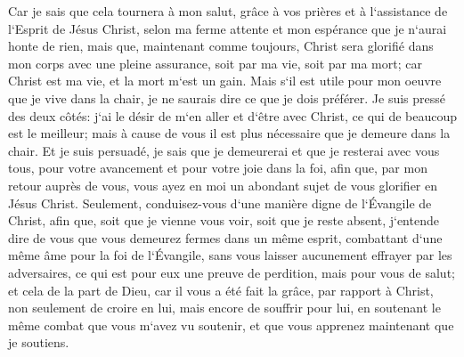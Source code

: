 \verse Car je sais que cela tournera à mon salut, grâce à vos prières et à l`assistance de l`Esprit de Jésus Christ, 
\verse selon ma ferme attente et mon espérance que je n`aurai honte de rien, mais que, maintenant comme toujours, Christ sera glorifié dans mon corps avec une pleine assurance, soit par ma vie, soit par ma mort; 
\verse car Christ est ma vie, et la mort m`est un gain. 
\verse Mais s`il est utile pour mon oeuvre que je vive dans la chair, je ne saurais dire ce que je dois préférer. 
\verse Je suis pressé des deux côtés: j`ai le désir de m`en aller et d`être avec Christ, ce qui de beaucoup est le meilleur; 
\verse mais à cause de vous il est plus nécessaire que je demeure dans la chair. 
\verse Et je suis persuadé, je sais que je demeurerai et que je resterai avec vous tous, pour votre avancement et pour votre joie dans la foi, 
\verse afin que, par mon retour auprès de vous, vous ayez en moi un abondant sujet de vous glorifier en Jésus Christ. 
\verse Seulement, conduisez-vous d`une manière digne de l`Évangile de Christ, afin que, soit que je vienne vous voir, soit que je reste absent, j`entende dire de vous que vous demeurez fermes dans un même esprit, combattant d`une même âme pour la foi de l`Évangile, 
\verse sans vous laisser aucunement effrayer par les adversaires, ce qui est pour eux une preuve de perdition, mais pour vous de salut; 
\verse et cela de la part de Dieu, car il vous a été fait la grâce, par rapport à Christ, non seulement de croire en lui, mais encore de souffrir pour lui, 
\verse en soutenant le même combat que vous m`avez vu soutenir, et que vous apprenez maintenant que je soutiens. 

\chapter{}

